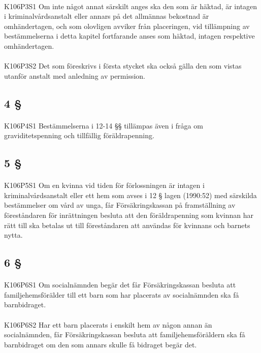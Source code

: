 \documentclass[a4paper,notitlepage,openany,10pt]{book}
\begin{document}
\paragraph*{}
{\tiny K106P3S1}
Om inte något annat särskilt anges ska den som är häktad, är intagen i kriminalvårdsanstalt eller annars på det allmännas bekostnad är omhändertagen, och som olovligen avviker från placeringen, vid tillämpning av bestämmelserna i detta kapitel fortfarande anses som häktad, intagen respektive omhändertagen.
\paragraph*{}
{\tiny K106P3S2}
Det som föreskrivs i första stycket ska också gälla den som vistas utanför anstalt med anledning av permission.
\subsection*{4 §}
\paragraph*{}
{\tiny K106P4S1}
Bestämmelserna i 12-14 §§ tillämpas även i fråga om graviditetspenning och tillfällig föräldrapenning.
\subsection*{5 §}
\paragraph*{}
{\tiny K106P5S1}
Om en kvinna vid tiden för förlossningen är intagen i kriminalvårdsanstalt eller ett hem som avses i 12 § lagen (1990:52) med särskilda bestämmelser om vård av unga, får Försäkringskassan på framställning av föreståndaren för inrättningen besluta att den föräldrapenning som kvinnan har rätt till ska betalas ut till föreståndaren att användas för kvinnans och barnets nytta.
\subsection*{6 §}
\paragraph*{}
{\tiny K106P6S1}
Om socialnämnden begär det får Försäkringskassan besluta att familjehemsförälder till ett barn som har placerats av socialnämnden ska få barnbidraget.
\paragraph*{}
{\tiny K106P6S2}
Har ett barn placerats i enskilt hem av någon annan än socialnämnden, får Försäkringskassan besluta att familjehemsföräldern ska få barnbidraget om den som annars skulle få bidraget begär det.
\end{document}
